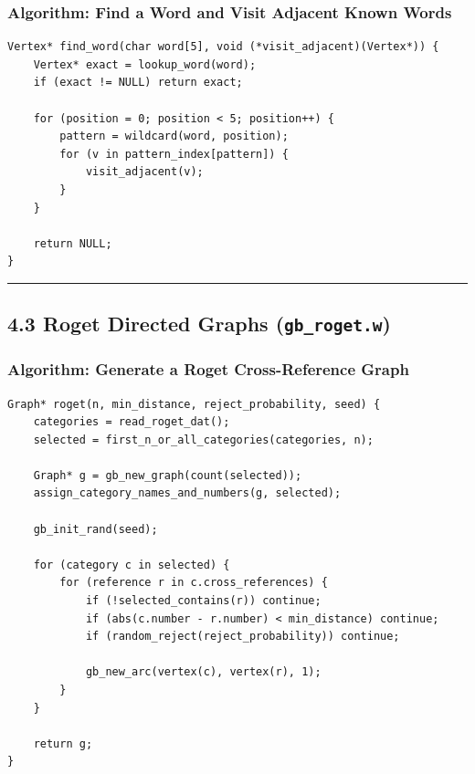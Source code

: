 \documentclass[11pt]{article}
\begin{document}
\subsubsection{Algorithm: Find a Word and Visit Adjacent Known Words}\label{algorithm-find-a-word-and-visit-adjacent-known-words}

\begin{verbatim}
Vertex* find_word(char word[5], void (*visit_adjacent)(Vertex*)) {
    Vertex* exact = lookup_word(word);
    if (exact != NULL) return exact;

    for (position = 0; position < 5; position++) {
        pattern = wildcard(word, position);
        for (v in pattern_index[pattern]) {
            visit_adjacent(v);
        }
    }

    return NULL;
}
\end{verbatim}

\begin{center}\rule{0.5\linewidth}{0.5pt}\end{center}

\subsection{\texorpdfstring{4.3 Roget Directed Graphs (\texttt{gb\_roget.w})}{4.3 Roget Directed Graphs (gb\_roget.w)}}\label{roget-directed-graphs-gb_roget.w}

\subsubsection{Algorithm: Generate a Roget Cross-Reference Graph}\label{algorithm-generate-a-roget-cross-reference-graph}

\begin{verbatim}
Graph* roget(n, min_distance, reject_probability, seed) {
    categories = read_roget_dat();
    selected = first_n_or_all_categories(categories, n);

    Graph* g = gb_new_graph(count(selected));
    assign_category_names_and_numbers(g, selected);

    gb_init_rand(seed);

    for (category c in selected) {
        for (reference r in c.cross_references) {
            if (!selected_contains(r)) continue;
            if (abs(c.number - r.number) < min_distance) continue;
            if (random_reject(reject_probability)) continue;

            gb_new_arc(vertex(c), vertex(r), 1);
        }
    }

    return g;
}
\end{verbatim}
\end{document}

